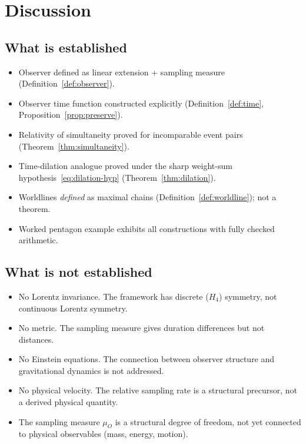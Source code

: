 \documentclass[12pt]{article}
\begin{document}
\section{Discussion}\label{sec:discussion}

\subsection{What is established}

\begin{itemize}
    \item Observer defined as linear extension + sampling measure (Definition~\ref{def:observer}).
    \item Observer time function constructed explicitly (Definition~\ref{def:time}, Proposition~\ref{prop:preserve}).
    \item Relativity of simultaneity proved for incomparable event pairs (Theorem~\ref{thm:simultaneity}).
    \item Time-dilation analogue proved under the sharp weight-sum hypothesis~\eqref{eq:dilation-hyp} (Theorem~\ref{thm:dilation}).
    \item Worldlines \emph{defined} as maximal chains (Definition~\ref{def:worldline}); not a theorem.
    \item Worked pentagon example exhibits all constructions with fully checked arithmetic.
\end{itemize}

\subsection{What is not established}

\begin{itemize}
    \item No Lorentz invariance. The framework has discrete ($H_4$) symmetry, not continuous Lorentz symmetry.
    \item No metric. The sampling measure gives duration differences but not distances.
    \item No Einstein equations. The connection between observer structure and gravitational dynamics is not addressed.
    \item No physical velocity. The relative sampling rate is a structural precursor, not a derived physical quantity.
    \item The sampling measure $\mu_O$ is a structural degree of freedom, not yet connected to physical observables (mass, energy, motion).
\end{itemize}
\end{document}
